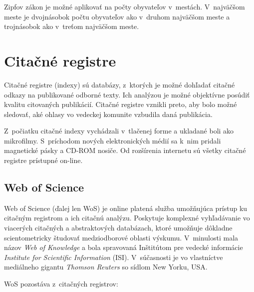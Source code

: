 Zipfov zákon je možné aplikovať na počty obyvateľov v~mestách.  V~najväčšom
meste je dvojnásobok počtu obyvateľov ako v~druhom najväčšom meste a trojnásobok
ako v~treťom najväčšom meste. \citet{Jiang2014}



\section{Citačné registre}

Citačné registre (indexy) sú databázy, z~ktorých je možné dohľadať citačné
odkazy na publikované odborné texty.  Ich analýzou je možné objektívne posúdiť
kvalitu citovaných publikácií.  Citačné registre vznikli preto, aby bolo možné
sledovať, aké ohlasy vo vedeckej komunite vzbudila daná publikácia.

Z~počiatku citačné indexy vychádzali v~tlačenej forme a ukladané boli ako
mikrofilmy.  S~príchodom nových elektronických médií sa k~nim pridali magnetické
pásky a CD-ROM nosiče.  Od rozšírenia internetu sú všetky citačné registre
prístupné on-line.


\subsection{Web of Science}

Web of Science (ďalej len WoS) je online platená služba umožňujúca prístup ku
citačným registrom a ich citačnú analýzu.  Poskytuje komplexné vyhľadávanie vo
viacerých citačných a abstraktových databázach, ktoré umožňuje dôkladne
scientometricky študovať medziodborové oblasti výskumu.  V~minulosti mala názov
\emph{Web of Knowledge} a bola spravovaná Inštitútom pre vedecké informácie
\emph{Institute for Scientific Information} (ISI).  V~súčasnosti je vo
vlastníctve mediálneho gigantu \emph{Thomson Reuters} so sídlom New Yorku,
USA. \citep{Drake2005}

WoS pozostáva z~citačných registrov:

